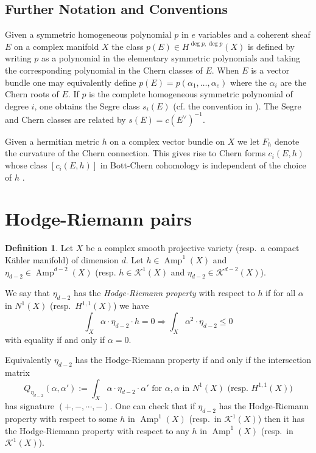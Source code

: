 \documentclass[a4,reqno]{amsart}
\theoremstyle{definition}
\newtheorem{definition}[theorem]{Definition}
\def\cK{\mathcal K}
\DeclareMathOperator{\Amp}{Amp}
\numberwithin{equation}{section}
\begin{document}
\subsection{Further Notation and Conventions}
Given a symmetric homogeneous polynomial $p$ in $e$ variables and a coherent sheaf $E$ on a complex manifold $X$ the class $p(E)\in H^{\deg p,\deg p}(X)$ is defined by writing $p$ as a polynomial in the elementary symmetric polynomials and taking the corresponding polynomial in the Chern classes of $E$.  When $E$ is a vector bundle one may equivalently define $p(E)=p(\alpha_1,\ldots,\alpha_e)$ where the $\alpha_i$ are the Chern roots of $E$. If $p$ is the complete homogeneous symmetric polynomial of degree $i$, one obtains the Segre class $s_i(E)$ (cf. the convention in \cite[p.~28]{Fulton-Pragacz}). The Segre and Chern classes are related by $s(E) = c(E^\vee)^{-1}$.

Given a hermitian metric $h$ on a complex vector bundle on $X$ we let $F_h$ denote the curvature of the Chern connection.   This gives rise to Chern forms $c_i(E,h)$ whose class $[c_i(E,h)]$ in Bott-Chern cohomology is independent of the choice of $h$ \cite[Chapter 2.4]{Bismut_superconnections}.


\section{Hodge-Riemann pairs}\label{sec:HRpairs}



\begin{definition}\label{def:HRproperty} 
Let $X$ be a complex smooth projective variety (resp.\ a compact K\"ahler manifold) of dimension $d$.  Let $h\in \Amp^1(X)$ and $\eta_{d-2}\in \Amp^{d-2}(X)$ (resp. $h\in \cK^1(X)$ and $\eta_{d-2}\in \cK^{d-2}(X)$).  

We say that $\eta_{d-2}$ has the \emph{Hodge-Riemann property} with respect to $h$ if  
for all $\alpha$ in $N^1(X)$ (resp.\ $H^{1,1}(X)$) we have
\begin{equation}\int_X \alpha \cdot \eta_{d-2} \cdot h =0 \Rightarrow \int_X \alpha^2 \cdot \eta_{d-2}\le 0\label{eq:HR}\end{equation}
with equality if and only if $\alpha=0$.
\end{definition}


Equivalently $\eta_{d-2}$ has the Hodge-Riemann property if and only if the intersection matrix
$$ Q_{\eta_{d-2}}(\alpha,\alpha') := \int_X \alpha \cdot \eta_{d-2} \cdot \alpha' \text{ for } \alpha,\alpha \text{ in } N^1(X)\text{ (resp.\ } H^{1,1}(X)\text{)}$$
has signature $(+,-,\cdots,-)$.  One can check that if $\eta_{d-2}$ has the Hodge-Riemann property with respect to some $h$ in $\Amp^1(X)$ (resp.\ in $\cK^1(X)$) then it has the Hodge-Riemann property with respect to any $h$ in $\Amp^1(X)$ (resp.\ in $\cK^1(X)$). 
\end{document}
